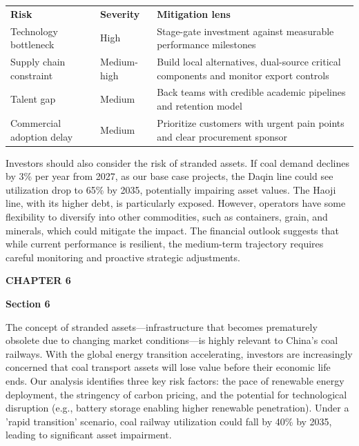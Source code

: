 \documentclass[10pt,a4paper]{article}
\begin{document}
\vspace{4pt}{\textcolor{BOBlue}{\scriptsize\bfseries RISK REGISTER AND MITIGATION LOGIC}}\par
\begin{tabularx}{\linewidth}{p{36mm}p{25mm}Y}
\textcolor{BOBlue}{\bfseries Risk} & \textcolor{BOBlue}{\bfseries Severity} & \textcolor{BOBlue}{\bfseries Mitigation lens} \\
Technology bottleneck & High & Stage-gate investment against measurable performance milestones \\
Supply chain constraint & Medium-high & Build local alternatives, dual-source critical components and monitor export controls \\
Talent gap & Medium & Back teams with credible academic pipelines and retention model \\
Commercial adoption delay & Medium & Prioritize customers with urgent pain points and clear procurement sponsor \\
\end{tabularx}

{\small {\small Investors should also consider the risk of stranded assets. If coal demand declines by 3\% per year from 2027, as our base case projects, the Daqin line could see utilization drop to 65\% by 2035, potentially impairing asset values. The Haoji line, with its higher debt, is particularly exposed. However, operators have some flexibility to diversify into other commodities, such as containers, grain, and minerals, which could mitigate the impact. The financial outlook suggests that while current performance is resilient, the medium-term trajectory requires careful monitoring and proactive strategic adjustments.}}

\clearpage
{\textcolor{BOBlue}{\scriptsize\bfseries CHAPTER 6}}\par\vspace{-1pt}
{\Large\sffamily\bfseries\color{BONavy} Section 6}\par\vspace{4pt}
{\small The concept of stranded assets—infrastructure that becomes prematurely obsolete due to changing market conditions—is highly relevant to China's coal railways. With the global energy transition accelerating, investors are increasingly concerned that coal transport assets will lose value before their economic life ends. Our analysis identifies three key risk factors: the pace of renewable energy deployment, the stringency of carbon pricing, and the potential for technological disruption (e.g., battery storage enabling higher renewable penetration). Under a 'rapid transition' scenario, coal railway utilization could fall by 40\% by 2035, leading to significant asset impairment.}
\end{document}

